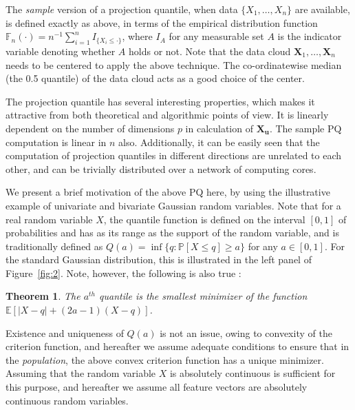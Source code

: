 \documentclass[twoside]{article}
\newtheorem{Theorem}{Theorem}[section]
\begin{document}
The {\it sample} version of a projection 
quantile, when data $\{ X_{1}, \ldots, X_{n} \}$ are available, is defined 
exactly as above, in terms of the empirical distribution function 
$\mathbb{F}_{n} (\cdot) = n^{-1} \sum_{i=1}^{n} I_{\{ X_{i} \leq \cdot \}}$, where 
$I_{A}$ for any measurable set $A$ is the indicator variable denoting whether $A$ holds
or not. 
Note that the data cloud $\mathbf{X}_{1}, \ldots, \mathbf{X}_{n}$ needs to be centered 
to apply the above technique. 
 The co-ordinatewise median (the 0.5 quantile) of the data cloud acts as a good choice of the center. 
 
The projection quantile has several interesting properties, which makes it 
attractive from both theoretical and algorithmic points of view. 
It is  linearly 
dependent on the number of dimensions $p$  in 
calculation of $\mathbf{X}_\mathbf{u}$. The sample PQ computation is linear in $n$ also. 
Additionally, it can be easily seen that the computation of projection quantiles 
in different directions are unrelated to each other, and can be trivially distributed
over a network of computing cores. 

We present a brief motivation of the above PQ here, by using the illustrative example of 
univariate and bivariate Gaussian random variables. Note that for a real random 
variable $X$, 
the quantile function is defined on the interval $[0, 1]$ of probabilities and has as 
its range as the support of the random variable, and is traditionally defined as 
$Q (a) = \inf \{ q: \mathbb{P} [ X \leq q ] \geq a \}$ for any $a \in [0,1]$. For the 
standard Gaussian distribution, this is illustrated in the left panel of 
Figure~\ref{fig:2}. Note, however, the following is also true 
\cite{Fergu67, Chaudhuri96}:

\begin{Theorem} 
The $a^{th}$ quantile is the smallest minimizer of the function 
$\mathbb{E} \left[ | X - q| + (2 a - 1) (X - q) \right]$. 
\end{Theorem} 

Existence and uniqueness of $Q (a)$ is not an issue, owing to convexity of the 
criterion function, and hereafter we assume adequate conditions to ensure that in
the {\it population}, the above convex criterion function has a unique minimizer. 
Assuming that the random variable $X$ is absolutely continuous is sufficient 
for this purpose, and hereafter we assume all feature vectors are absolutely continuous 
random variables.
\end{document}
